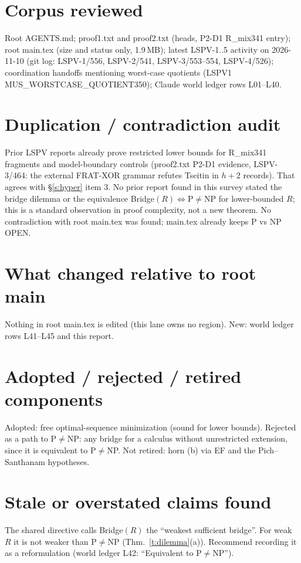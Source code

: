 \documentclass[11pt]{article}
\theoremstyle{definition}
\theoremstyle{remark}
\begin{document}
\section{Corpus reviewed}
Root AGENTS.md; proof1.txt and proof2.txt (heads, P2-D1 R\_mix341 entry); root main.tex (size and status only, 1.9\,MB);
latest LSPV-1..5 activity on 2026-11-10 (git log: LSPV-1/556, LSPV-2/541, LSPV-3/553--554, LSPV-4/526);
coordination handoffs mentioning worst-case quotients (LSPV1 MUS\_WORSTCASE\_QUOTIENT350); Claude world ledger rows L01--L40.

\section{Duplication / contradiction audit}
Prior LSPV reports already prove restricted lower bounds for R\_mix341 fragments and model-boundary controls (proof2.txt P2-D1 evidence, LSPV-3/464:
the external FRAT-XOR grammar refutes Tseitin in $h+2$ records). That agrees with \S\ref{s:hyper} item 3. No prior report found in this survey stated the
bridge dilemma or the equivalence Bridge$(R)\iff$P$\ne$NP for lower-bounded $R$; this is a standard observation in proof complexity, not a new theorem.
No contradiction with root main.tex was found; main.tex already keeps P vs NP OPEN.

\section{What changed relative to root main}
Nothing in root main.tex is edited (this lane owns no region). New: world ledger rows L41--L45 and this report.

\section{Adopted / rejected / retired components}
Adopted: free optimal-sequence minimization (sound for lower bounds). Rejected as a path to P$\ne$NP: any bridge for a calculus without unrestricted extension,
since it is equivalent to P$\ne$NP. Not retired: horn (b) via EF and the Pich--Santhanam hypotheses.

\section{Stale or overstated claims found}
The shared directive calls Bridge$(R)$ the ``weakest sufficient bridge''. For weak $R$ it is not weaker than P$\ne$NP (Thm.~\ref{t:dilemma}(a)). Recommend
recording it as a reformulation (world ledger L42: ``Equivalent to P$\ne$NP'').
\end{document}
